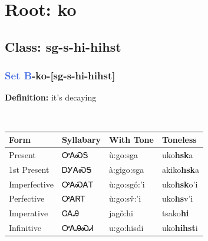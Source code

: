 \needspace{4in}
\section*{Root: ko}
\nopagebreak
{}
\needspace{3in}
\subsection*{Class: sg-s-hi-hihst}
\nopagebreak
\needspace{2in}
\subsubsection*{\textcolor{RoyalBlue}{Set B}{-}\textbf{ko}{-}[sg-s-hi-hihst]}
\nopagebreak
\textbf{Definition: } it{\textquoteright}s decaying
\\[0.5em]
\begin{tabularx}{\textwidth}{l X X X}%
\toprule%
\textbf{Form}&\textbf{Syllabary}&\textbf{With Tone}&\textbf{Toneless}\\%
\midrule%
Present&ᎤᎪᏍᎦ&ù:go:sga&uko\textbf{hsk}a\\%
1st Present&ᎠᎩᎪᏍᎦ&à:gigo:sga&akiko\textbf{hsk}a\\%
Imperfective&ᎤᎪᏍᎪᎢ&ù:go:sgó:’i&uko\textbf{hsk}o'i\\%
Perfective&ᎤᎪᏒᎢ&ù:go:sv̌:’i&uko\textbf{hs}v'i\\%
Imperative&ᏣᎪᎯ&jagǒ:hi&tsako\textbf{hi}\\%
Infinitive&ᎤᎪᎯᏍᏗ&u:go:hisdi&uko\textbf{hihst}i\\%
\bottomrule%
\end{tabularx}
\\[1em]